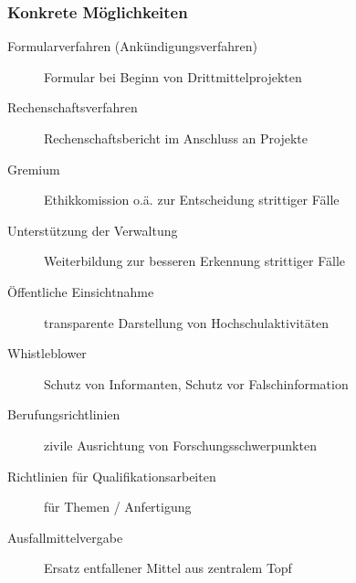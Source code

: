 \documentclass[presentation]{beamer}
\begin{document}
\begin{frame}
\frametitle{Konkrete Möglichkeiten}
\label{sec-4-5}

\fontsize{8pt}{9.6}\selectfont
\begin{description}
\item[Formularverfahren (Ankündigungsverfahren)] \tiny Formular bei Beginn von Drittmittelprojekten
\end{description}
\fontsize{8pt}{9.6}\selectfont
\begin{description}
\item[Rechenschaftsverfahren] \tiny Rechenschaftsbericht im Anschluss an Projekte\\
\end{description}
\fontsize{8pt}{9.6}\selectfont
\begin{description}
\item[Gremium] \tiny Ethikkomission o.ä. zur Entscheidung strittiger Fälle\\
\end{description}
\fontsize{8pt}{9.6}\selectfont
\begin{description}
\item[Unterstützung der Verwaltung] \tiny Weiterbildung zur besseren Erkennung strittiger Fälle\\
\end{description}
\fontsize{8pt}{9.6}\selectfont
\begin{description}
\item[Öffentliche Einsichtnahme] \tiny transparente Darstellung von Hochschulaktivitäten
\end{description}
\fontsize{8pt}{9.6}\selectfont
\begin{description}
\item[Whistleblower] \tiny Schutz von Informanten, Schutz vor Falschinformation
\end{description}
\fontsize{8pt}{9.6}\selectfont
\begin{description}
\item[Berufungsrichtlinien] \tiny zivile Ausrichtung von Forschungsschwerpunkten
\end{description}
\fontsize{8pt}{9.6}\selectfont
\begin{description}
\item[Richtlinien für Qualifikationsarbeiten] \tiny für Themen / Anfertigung
\end{description}
\fontsize{8pt}{9.6}\selectfont
\begin{description}
\item[Ausfallmittelvergabe] \tiny Ersatz entfallener Mittel aus zentralem Topf

\end{description}
\end{frame}
\end{document}

